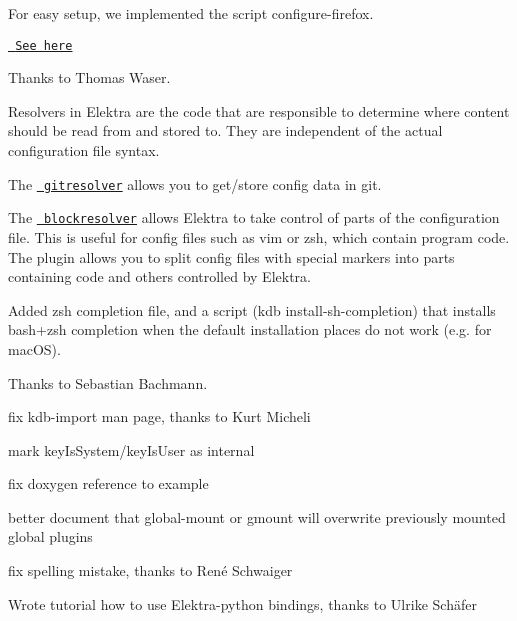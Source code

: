 For easy setup, we implemented the script {\ttfamily configure-\/firefox}.

\href{https://master.libelektra.org/src/bindings/intercept}{\texttt{ See here}}

Thanks to Thomas Waser.

Resolvers in Elektra are the code that are responsible to determine where content should be read from and stored to. They are independent of the actual configuration file syntax.

The \href{https://master.libelektra.org/src/plugins/gitresolver}{\texttt{ gitresolver}} allows you to get/store config data in git.

The \href{https://master.libelektra.org/src/plugins/blockresolver}{\texttt{ blockresolver}} allows Elektra to take control of parts of the configuration file. This is useful for config files such as vim or zsh, which contain program code. The plugin allows you to split config files with special markers into parts containing code and others controlled by Elektra.

Added zsh completion file, and a script ({\ttfamily kdb install-\/sh-\/completion}) that installs bash+zsh completion when the default installation places do not work (e.\+g. for mac\+OS).

Thanks to Sebastian Bachmann.


\begin{DoxyItemize}
\item fix {\ttfamily kdb-\/import} man page, thanks to Kurt Micheli
\item mark {\ttfamily key\+Is\+System}/{\ttfamily key\+Is\+User} as internal
\item fix doxygen reference to example
\item better document that {\ttfamily global-\/mount} or {\ttfamily gmount} will overwrite previously mounted global plugins
\item fix spelling mistake, thanks to René Schwaiger
\item Wrote tutorial how to use Elektra-\/python bindings, thanks to Ulrike Schäfer
\end{DoxyItemize}


